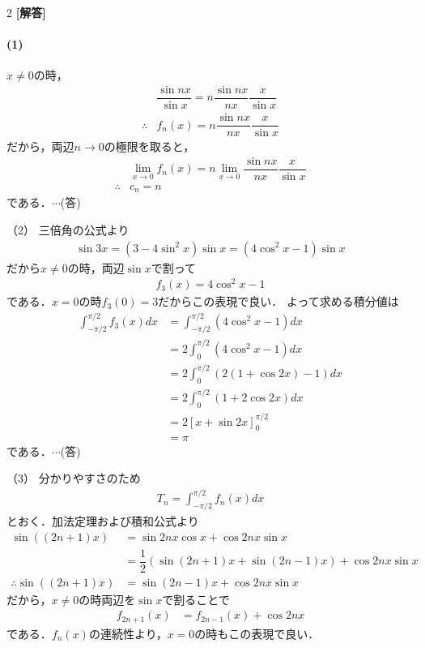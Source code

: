 \documentclass[../../main.tex]{subfiles}
\begin{document}
\setcounter{equation}{0}
\begin{oframed}
  
\end{oframed}
\setlength{\columnseprule}{0.4pt}
\begin{multicols}{2}
  {\bf [解答]}

  \paragraph{(1)}
  $x \neq 0$の時，
  \begin{align}
    & \dfrac{\sin nx}{\sin x} = n\dfrac{\sin nx}{nx}\dfrac{x}{\sin x } \\
    \therefore
    & f_{n}(x) = n\dfrac{\sin nx}{nx}\dfrac{x}{\sin x }
  \end{align}
  だから，両辺$n\to 0$の極限を取ると，
  \begin{align}
    & \lim_{x\to 0}f_{n}(x) = n \lim_{x\to 0} \dfrac{\sin nx}{nx}\dfrac{x}{\sin x } \\
    \therefore
    & c_{n} = n
  \end{align}
  である．$\cdots$(答)

  （2）
  三倍角の公式より
  \begin{align}
    \sin 3x = (3-4\sin^2 x)\sin x = (4\cos^2 x - 1)\sin x
  \end{align}
  だから$x\neq 0$の時，両辺$\sin x$で割って
  \begin{align}
    f_3(x) = 4\cos^2 x - 1
  \end{align}
  である．$x=0$の時$f_3(0)=3$だからこの表現で良い．
  よって求める積分値は
  \begin{align}
    \int_{-\pi/2}^{\pi/2} f_3(x) dx
    & = \int_{-\pi/2}^{\pi/2} (4\cos^2 x - 1) dx \\
    & = 2\int_{0}^{\pi/2} (4\cos^2 x - 1) dx     \\
    & = 2\int_{0}^{\pi/2} (2(1+\cos 2x) - 1) dx  \\
    & = 2\int_{0}^{\pi/2} (1+2\cos 2x) dx        \\
    & = 2\left[x + \sin 2x\right]_{0}^{\pi/2}    \\
    & = \pi
  \end{align}
  である．$\cdots$(答)

  （3）
  分かりやすさのため
  \begin{align}
    T_n = \int_{-\pi/2}^{\pi/2} f_n(x) dx \label{eq:1}
  \end{align}
  とおく．加法定理および積和公式より
  \begin{align}
    \sin\left((2n+1)x\right)
    & = \sin 2nx \cos x + \cos 2nx \sin x                                   \\
    & = \dfrac{1}{2}\left(\sin(2n+1)x + \sin(2n-1)x\right) + \cos 2nx \sin x \\
    \therefore
    \sin\left((2n+1)x\right)
    & = \sin(2n-1)x + \cos 2nx \sin x
  \end{align}
  だから，$x\neq 0$の時両辺を$\sin x$で割ることで
  \begin{align}
    f_{2n+1}(x) & = f_{2n-1}(x) + \cos 2nx
  \end{align}
  である．$f_{n}(x)$の連続性より，$x= 0$の時もこの表現で良い．


\end{multicols}
\end{document}
